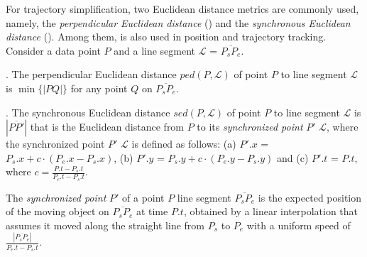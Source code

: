 For trajectory simplification, two Euclidean distance metrics are commonly used, namely, the \emph{perpendicular Euclidean distance} (\ped) and the \emph{synchronous Euclidean distance} \cite{Meratnia:Spatiotemporal} (\sed). Among them, \sed is also used in position and trajectory tracking.
%
Consider a data point $P$ and a line segment $\mathcal{L}$ = $\overline{P_{s}P_{e}}$.

. The perpendicular Euclidean distance $ped\left(P, \mathcal{L}\right)$ of point $P$ to line segment $\mathcal{L}$ is $\min\{|PQ|\}$ for any point $Q$ on $\overline{P_{s}P_{e}}$.

. The synchronous Euclidean distance $sed\left(P, \mathcal{L}\right)$ of point $P$ to line segment $\mathcal{L}$ is $|\overline{PP'}|$ that is the Euclidean distance from $P$ to its \textit{synchronized point} $P'$ \wrt $\mathcal{L}$, where the synchronized point $P'$ \wrt $\mathcal{L}$ is defined as follows:
(a) $P'.x$ = $P_s.x +  c\cdot\left(P_e.x - P_s.x\right)$,
(b) $P'.y$ = $P_s.y +  c\cdot\left(P_e.y - P_s.y\right)$ and
(c) $P'.t$ = $P.t$, where $c= \frac{P.t-P_s.t}{P_e.t-P_s.t}$.

The \emph{synchronized point} $P'$ of a point $P$ \wrt line segment $\overline{P_sP_e}$ is the expected position of the moving object on $\overline{P_sP_e}$ at time $P.t$, obtained by a linear interpolation \cite{Cao:Spatio} that assumes it moved along the straight line from $P_s$ to $P_e$ with a uniform speed of $\frac{|\overline{P_sP_e}|}{P_e.t-P_s.t}$.





